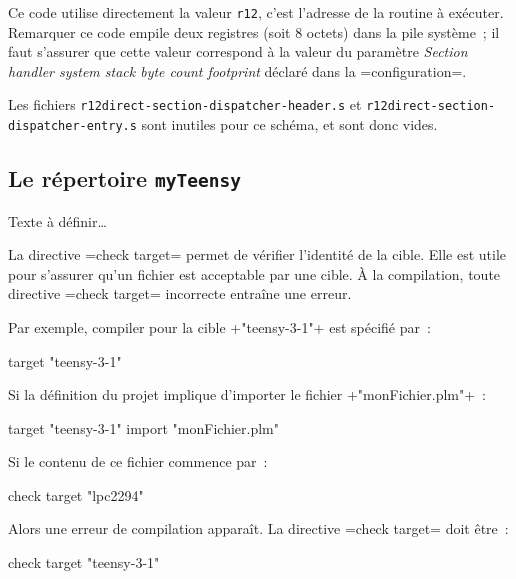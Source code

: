 Ce code utilise directement la valeur \texttt{r12}, c'est l'adresse de la routine à exécuter. Remarquer ce code empile deux registres (soit 8 octets) dans la pile système~; il faut s'assurer que cette valeur correspond à la valeur du paramètre \emph{Section handler system stack byte count footprint} déclaré dans la \plm=configuration=.


Les fichiers \texttt{r12direct-section-dispatcher-header.s} et \texttt{r12direct-section-dispatcher-entry.s} sont inutiles pour ce schéma, et sont donc vides.










\subsection{Le répertoire \texttt{myTeensy}}

Texte à définir…





La directive \plm=check target= permet de vérifier l'identité de la cible. Elle est utile pour s'assurer qu'un fichier est acceptable par une cible. À la compilation, toute directive \plm=check target= incorrecte entraîne une erreur.

Par exemple, compiler pour la cible \plm+"teensy-3-1"+ est spécifié par~:

\begin{PLM}
target "teensy-3-1"
\end{PLM}

Si la définition du projet implique d'importer le fichier \plm+"monFichier.plm"+~:

\begin{PLM}
target "teensy-3-1"
import "monFichier.plm"
\end{PLM}

Si le contenu de ce fichier commence par~:
\begin{PLM}
check target "lpc2294"
\end{PLM}

Alors une erreur de compilation apparaît. La directive \plm=check target= doit être~:
\begin{PLM}
check target "teensy-3-1"
\end{PLM}

